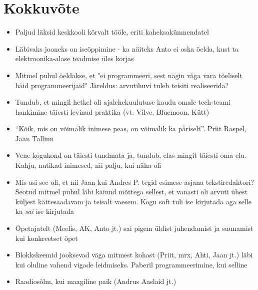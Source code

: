 \documentclass{tufte-book}
\begin{document}
\chapter{Kokkuvõte}
\begin{itemize}
	\item Paljud läksid keskkooli kõrvalt tööle, eriti kaheksakümnendatel
	\item Läbivaks jooneks on iseõppimine - ka näiteks Anto ei oska öelda, kust ta elektroonika-alase teadmise üles korjas
	\item Mitmel puhul öeldakse, et "ei programmeeri, sest nägin väga vara tõeliselt häid programmeerijaid" Järeldus: arvutihuvi tuleb teisiti realiseerida?
	\item Tundub, et mingil hetkel oli ajalehekuulutuse kaudu omale tech-teami hankimine täiesti levinud praktika (vt. Vilve, Bluemoon, Kütt)
	\item \enquote{Kõik, mis on võimalik inimese peas, on võimalik ka päriselt}. Priit Raspel, Jaan Tallinn
	\item Vene kogukond on täiesti tundmata ja, tundub, elas mingit täiesti oma elu. Kahju, nutikad inimesed, nii palju, kui näha oli
	\item Mis asi see oli, et nii Jaan kui Andres P. tegid esimese asjana tekstiredaktori? Seotud mitmel puhul läbi käinud mõttega sellest, et vanasti oli arvuti ühest küljest kättesaadavam ja teisalt vaesem. Kogu soft tuli ise kirjutada aga selle ka \emph{sai} ise kirjutada
	\item Õpetajatelt (Meelis, AK, Anto jt.) sai pigem üldist juhendamist ja suunamist kui konkreetset õpet
	\item Blokkskeemid jooksevad väga mitmest kohast (Priit, mrx, Ahti, Jaan jt.) läbi kui oluline vahend vigade leidmiseks. Paberil programmeerimine, kui selline
	\item Raadiosõlm, kui maagiline paik (Andrus Aaslaid jt.)
\end{itemize}




\backmatter





\printindex[ppl]
\printindex
\end{document}
